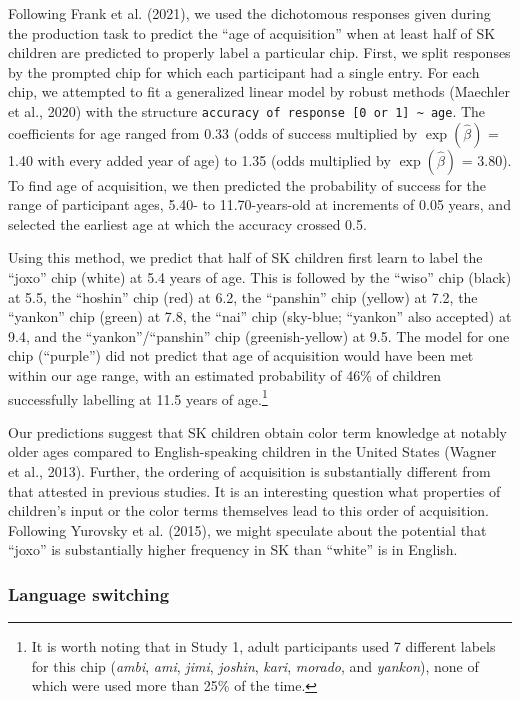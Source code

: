 \documentclass[
  english,
  ,apa7,floatsintext]{apa6}
\begin{document}
Following Frank et al. (2021), we used the dichotomous responses given during the production task to predict the ``age of acquisition'' when at least half of SK children are predicted to properly label a particular chip. First, we split responses by the prompted chip for which each participant had a single entry. For each chip, we attempted to fit a generalized linear model by robust methods (Maechler et al., 2020) with the structure \texttt{accuracy\ of\ response\ {[}0\ or\ 1{]}\ \textasciitilde{}\ age}. The coefficients for age ranged from 0.33 (odds of success multiplied by \(\exp{(\hat{\beta})}\) = 1.40 with every added year of age) to 1.35 (odds multiplied by \(\exp{(\hat{\beta})}\) = 3.80). To find age of acquisition, we then predicted the probability of success for the range of participant ages, 5.40- to 11.70-years-old at increments of 0.05 years, and selected the earliest age at which the accuracy crossed 0.5.

Using this method, we predict that half of SK children first learn to label the ``joxo'' chip (white) at 5.4 years of age. This is followed by the ``wiso'' chip (black) at 5.5, the ``hoshin'' chip (red) at 6.2, the ``panshin'' chip (yellow) at 7.2, the ``yankon'' chip (green) at 7.8, the ``nai'' chip (sky-blue; ``yankon'' also accepted) at 9.4, and the ``yankon''/``panshin'' chip (greenish-yellow) at 9.5. The model for one chip (``purple'') did not predict that age of acquisition would have been met within our age range, with an estimated probability of 46\% of children successfully labelling at 11.5 years of age.\footnote{It is worth noting that in Study 1, adult participants used 7 different labels for this chip (\emph{ambi}, \emph{ami}, \emph{jimi}, \emph{joshin}, \emph{kari}, \emph{morado}, and \emph{yankon}), none of which were used more than 25\% of the time.}

Our predictions suggest that SK children obtain color term knowledge at notably older ages compared to English-speaking children in the United States (Wagner et al., 2013). Further, the ordering of acquisition is substantially different from that attested in previous studies. It is an interesting question what properties of children's input or the color terms themselves lead to this order of acquisition. Following Yurovsky et al. (2015), we might speculate about the potential that ``joxo'' is substantially higher frequency in SK than ``white'' is in English.

\hypertarget{language-switching}{%
\subsubsection{Language switching}\label{language-switching}}
\end{document}
